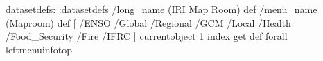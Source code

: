 \begin{ingrid}
datasetdefs:
:datasetdefs
/long_name (IRI Map Room) def
/menu_name (Maproom) def
[ /ENSO /Global /Regional /GCM /Local /Health /Food_Security /Fire /IFRC ]
{ currentobject 1 index get  def} forall
leftmenuinfotop
\end{ingrid}
